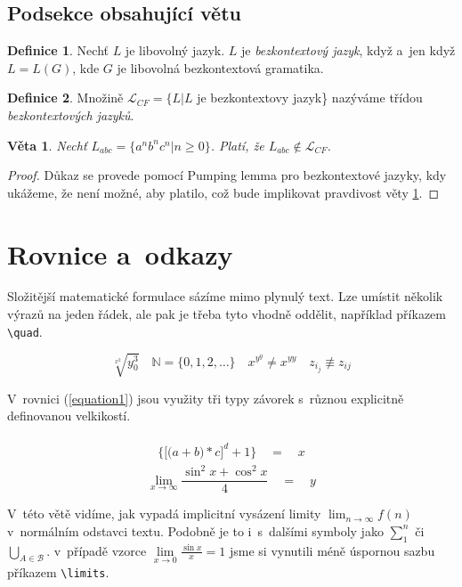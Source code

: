 \documentclass[11pt,twocolumn]{article}
\theoremstyle{definition}
\newtheorem{define}{Definice}[section]
\theoremstyle{plain}
\newtheorem{sentence}{Věta}
\begin{document}
\subsection {Podsekce obsahující větu}
\begin{define}
Nechť $L$ je libovolný jazyk. $L$ je \emph{bezkontextový jazyk}, když a~jen když $L =L(G)$, kde $G$ je libovolná bezkontextová gramatika.
\end{define}
\begin{define}
Množině $\mathcal{L}_{CF} =\{L|L$ je bezkontextovy jazyk\} nazýváme třídou \emph{bezkontextových jazyků}.
\end{define}
\begin{sentence} \label{sentence1}
\emph{Nechť $L_{abc} =\{a^n b^n c^n |n \geq 0\}$. Platí, že $L_{abc} \notin \mathcal{L}_{CF}$.}
\end{sentence}
\begin{proof}
Důkaz se provede pomocí Pumping lemma pro bezkontextové jazyky, kdy ukážeme, že není možné, aby platilo, což bude implikovat pravdivost věty \ref{sentence1}.
\end{proof}
\section{Rovnice a~odkazy}

Složitější matematické formulace sázíme mimo plynulý text. Lze umístit několik výrazů na jeden řádek, ale pak je třeba tyto vhodně oddělit, například příkazem \verb|\quad|.

$$ \sqrt[x^2]{y^3_{0}} \quad \mathbb{N} =\{0,1,2,\ldots\} \quad x^{y^y} \neq x^{yy} \quad z_{i_j} \not\equiv z_{ij} $$

V~rovnici (\ref{equation1}) jsou využity tři typy závorek s~různou explicitně definovanou velkikostí.

\begin{align} \label{equation1}
 \begin{split}
     \bigg\{ \Big[ \big(a + b \big) * c \Big] ^d + 1 \bigg\}\quad=\quad x
 \end{split}
\end{align}
$$\lim_{ x \to \infty} \frac{\sin^2x + \cos^2x}{4}\quad=\quad y$$

V~této větě vidíme, jak vypadá implicitní vysázení limity $\lim_{n\to\infty} f(n)$ v~normálním odstavci textu. Podobně je to i~s~dalšími symboly jako $\sum_1^n$ či $\bigcup_{A \in \mathcal{B}}$. v~případě vzorce $\lim\limits_{x\to0}\frac{\sin x}{x}=1$ jsme si vynutili méně úspornou sazbu příkazem \verb|\limits|.
\end{document}
